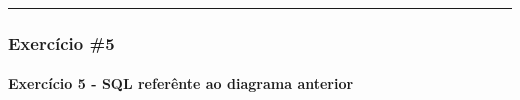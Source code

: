 \documentclass[
]{book}
\makeatletter
\newcommand*\pandocbounded[1]{%
  \sbox\pandoc@box{#1}%
  \Gscale@div\@tempa{\textheight}{\dimexpr\ht\pandoc@box+\dp\pandoc@box\relax}%
  \Gscale@div\@tempb{\linewidth}{\wd\pandoc@box}%
  \ifdim\@tempb\p@<\@tempa\p@\let\@tempa\@tempb\fi%
  \ifdim\@tempa\p@<\p@\scalebox{\@tempa}{\usebox\pandoc@box}%
  \else\usebox{\pandoc@box}%
  \fi%
}
\makeatother
\begin{document}
\begin{center}\rule{0.5\linewidth}{0.5pt}\end{center}

\subsubsection{Exercício \#5}\label{exercuxedcio-5-1}

\pandocbounded{}

\paragraph{Exercício 5 - SQL referênte ao diagrama anterior}\label{exercuxedcio-5---sql-referuxeante-ao-diagrama-anterior-1}
\end{document}
